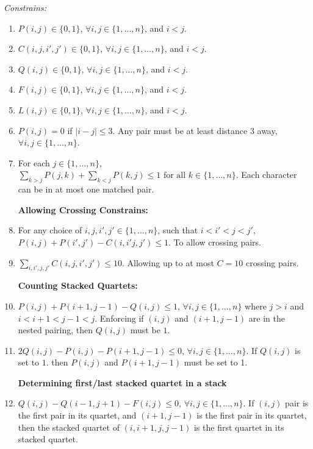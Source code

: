 \documentclass[11pt]{article}
\begin{document}
{\begin{enumerate}
\textit{Constrains:}
\begin{enumerate}
    \item $P(i,j)\in \{0,1\}$, $\forall i,j \in \{1,\dots, n\}$, and $i<j$.
    
    \item $C(i,j,i',j')\in \{0,1\}$, $\forall i,j \in \{1,\dots, n\}$, and $i<j$.
    
    \item $Q(i,j)\in \{0,1\}$, $\forall i,j \in \{1,\dots, n\}$, and $i<j$.
    
    \item $F(i,j)\in \{0,1\}$, $\forall i,j \in \{1,\dots, n\}$, and $i<j$.

    \item $L(i,j)\in \{0,1\}$, $\forall i,j \in \{1,\dots, n\}$, and $i<j$.

    \item $P(i,j)=0$ if $|i-j|\leq 3$. Any pair must be at least distance 3 away, $\forall i,j \in \{1,\dots, n\}$.

    \item For each $j\in  \{1,\dots, n\}$, $\sum_{k>j}P(j,k)+\sum_{k<j}P(k,j)\leq 1 \textrm{ for all }k\in \{1,\dots, n\}$. Each character can be in at most one matched pair.
    
    \textbf{Allowing Crossing Constrains:}
    \item For any choice of $i,j,i',j'\in \{1,\dots, n\}$, such that $i<i'<j<j'$, $P(i,j)+P(i',j')-C(i,i'j,j')\leq 1$. To allow crossing pairs.

    \item $\sum_{i,i',j,j'}C(i,j,i',j') \leq 10$. Allowing up to at most $C=10$ crossing pairs.

    \textbf{Counting Stacked Quartets:}
    \item $P(i,j)+P(i+1,j-1)-Q(i,j) \leq 1$,  $\forall i,j\in \{1,\dots,n\}$ where $j>i$ and $i<i+1<j-1<j$. Enforcing if $(i,j)$ and $(i+1,j-1)$ are in the nested pairing, then $Q(i,j)$ must be $1$.
    
    \item $2Q(i,j)-P(i,j)-P(i+1,j-1) \leq 0$, $\forall i,j\in \{1,\dots,n\}$. If $Q(i,j)$ is set to $1$. then $P(i,j)$ and $P(i+1,j-1)$ must be set to 1.

    \textbf{Determining first/last stacked quartet in a stack}
    \item $Q(i,j)-Q(i-1,j+1)-F(i,j) \leq 0$, $\forall i,j\in \{1,\dots,n\}$. If $(i,j)$ pair is the first pair in its quartet, and $(i+1,j-1)$ is the first pair in its quartet, then the stacked quartet of $(i,i+1,j,j-1)$ is the first quartet in its stacked quartet.


\end{enumerate}
\end{enumerate}}
\end{document}
